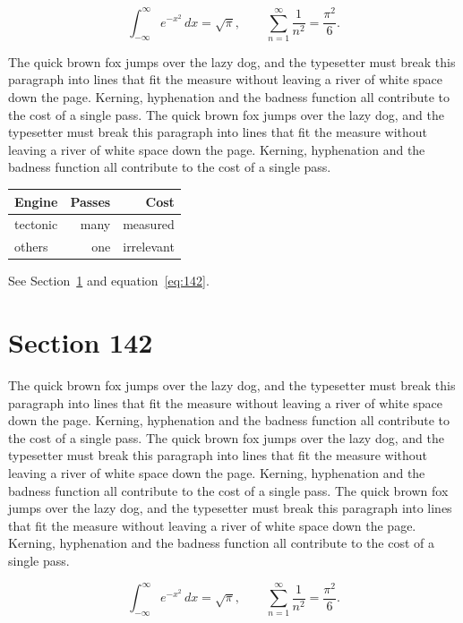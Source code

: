 \documentclass{article}
\begin{document}
\begin{equation}\label{eq:141}
\int_{-\infty}^{\infty} e^{-x^{2}}\,dx = \sqrt{\pi}, \qquad
\sum_{n=1}^{\infty} \frac{1}{n^{2}} = \frac{\pi^{2}}{6}.
\end{equation}

The quick brown fox jumps over the lazy dog, and the typesetter must break this paragraph into lines that fit the measure without leaving a river of white space down the page. Kerning, hyphenation and the badness function all contribute to the cost of a single pass. The quick brown fox jumps over the lazy dog, and the typesetter must break this paragraph into lines that fit the measure without leaving a river of white space down the page. Kerning, hyphenation and the badness function all contribute to the cost of a single pass. 

\begin{center}
\begin{tabular}{lrr}
\toprule
Engine & Passes & Cost \\
\midrule
tectonic & many & measured \\
others & one & irrelevant \\
\bottomrule
\end{tabular}
\end{center}

See Section~\ref{sec:142} and equation~\eqref{eq:142}.
\section{Section 142}
\label{sec:142}
The quick brown fox jumps over the lazy dog, and the typesetter must break this paragraph into lines that fit the measure without leaving a river of white space down the page. Kerning, hyphenation and the badness function all contribute to the cost of a single pass. The quick brown fox jumps over the lazy dog, and the typesetter must break this paragraph into lines that fit the measure without leaving a river of white space down the page. Kerning, hyphenation and the badness function all contribute to the cost of a single pass. The quick brown fox jumps over the lazy dog, and the typesetter must break this paragraph into lines that fit the measure without leaving a river of white space down the page. Kerning, hyphenation and the badness function all contribute to the cost of a single pass. 

\begin{equation}\label{eq:142}
\int_{-\infty}^{\infty} e^{-x^{2}}\,dx = \sqrt{\pi}, \qquad
\sum_{n=1}^{\infty} \frac{1}{n^{2}} = \frac{\pi^{2}}{6}.
\end{equation}
\end{document}
